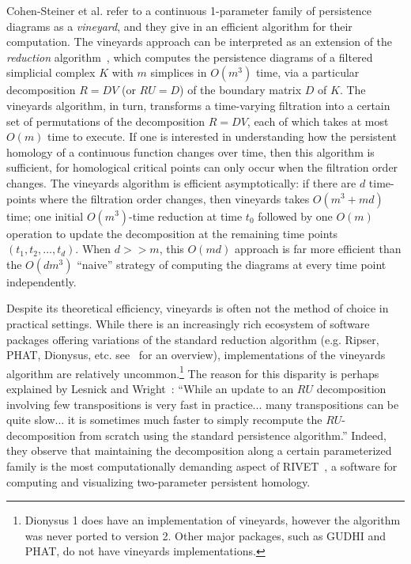 \documentclass[sn-mathphys]{sn-jnl}
\begin{document}
Cohen-Steiner et al. refer to a continuous 1-parameter family of persistence diagrams as a \emph{vineyard}, and they give in \cite{cohen2006vines} an efficient algorithm for their computation. 
The vineyards approach can be interpreted as an extension of the \emph{reduction} algorithm~\cite{zomorodian2005computing}, which computes the persistence diagrams of a filtered simplicial complex $K$ with $m$ simplices in $O(m^3)$ time, via a particular decomposition $R = D V$ (or $RU = D$) of the boundary matrix $D$ of $K$.
The vineyards algorithm, in turn,  transforms a time-varying filtration into a certain set of permutations of the decomposition $R = DV$, each of which takes at most $O(m)$ time to execute. If one is interested in understanding how the persistent homology of a continuous function changes over time, then this algorithm is sufficient, for homological critical points can only occur when the filtration order changes. 
The vineyards algorithm is efficient asymptotically: if there are $d$ time-points where the filtration order changes, then  vineyards   takes $O(m^3 + md)$ time; one initial $O(m^3)$-time reduction at time $t_0$ followed by one $O(m)$ operation to update the decomposition at the remaining time points $(t_1, t_2, \dots, t_d)$. When $d >> m$, this $O(md)$ approach is far more efficient than the $O(dm^3)$  ``naive'' strategy of computing the diagrams at every time point independently.

Despite its theoretical efficiency, vineyards is often not the method of choice in practical settings. 
While there is an increasingly rich ecosystem of software packages offering variations of the standard reduction algorithm (e.g. Ripser, PHAT, Dionysus, etc. see~\cite{otter2017roadmap} for an overview), implementations of the vineyards algorithm are relatively uncommon.\footnote{Dionysus 1 does have an implementation of vineyards, however the algorithm was never ported to version 2. Other major packages, such as GUDHI and PHAT, do not have vineyards implementations.} 
The reason for this disparity is perhaps explained by Lesnick and Wright~\cite{lesnick2015interactive}: ``While an update to an $RU$ decomposition involving few transpositions is very fast in practice... many transpositions can be quite slow... it is sometimes much faster to simply recompute the $RU$-decomposition from scratch using the standard persistence algorithm.'' Indeed, they observe that maintaining the decomposition along a certain parameterized family is the most computationally demanding aspect of RIVET~\cite{rivet}, a software for computing and visualizing	 two-parameter persistent homology.
\end{document}

